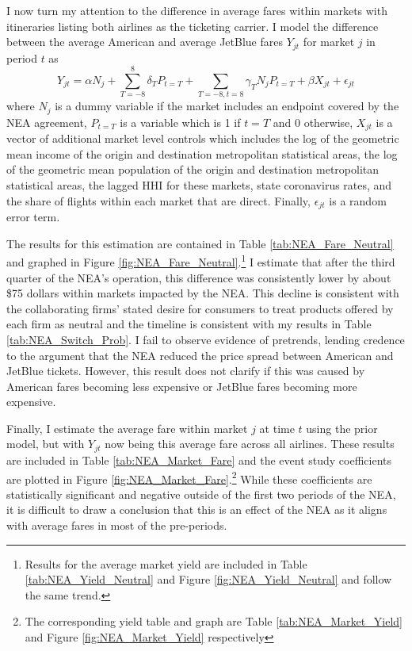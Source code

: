 \documentclass{article}
\begin{document}
	 I now turn my attention to the difference in average fares within markets with itineraries listing both airlines as the ticketing carrier.  I model the difference between the average American and average JetBlue fares $Y_{jt}$ for market $j$ in period $t$ as \[Y_{jt} = \alpha N_{j} + \sum_{T = -8}^{8} \delta_{T} P_{t = T} + \sum_{T = -8, t = 8} \gamma_{T} N_{j} P_{t = T} + \beta X_{jt} + \epsilon_{jt}\] where $N_{j}$ is a dummy variable if the market includes an endpoint covered by the NEA agreement, $P_{t = T}$ is a variable which is 1 if $t = T$ and 0 otherwise, $X_{jt}$ is a vector of additional market level controls which includes the log of the geometric mean income of the origin and destination metropolitan statistical areas, the log of the geometric mean population of the origin and destination metropolitan statistical areas, the lagged HHI for these markets, state coronavirus rates, and the share of flights within each market that are direct. Finally, $\epsilon_{jt}$ is a random error term. 
	 
	 The results for this estimation are contained in Table \ref{tab:NEA_Fare_Neutral} and graphed in Figure \ref{fig:NEA_Fare_Neutral}.\footnote{ Results for the average market yield are included in Table \ref{tab:NEA_Yield_Neutral} and Figure \ref{fig:NEA_Yield_Neutral} and follow the same trend.} I estimate that after the third quarter of the NEA's operation, this difference was consistently lower by about \$75 dollars within markets impacted by the NEA. This decline is consistent with the collaborating firms' stated desire for consumers to treat products offered by each firm as neutral and the timeline is consistent with my results in Table \ref{tab:NEA_Switch_Prob}. I fail to observe evidence of pretrends, lending credence to the argument that the NEA reduced the price spread between American and JetBlue tickets. However, this result does not clarify if this was caused by American fares becoming less expensive or JetBlue fares becoming more expensive. 
	
	Finally, I estimate the average fare within market $j$ at time $t$ using the prior model, but with $Y_{jt}$ now being this average fare across all airlines.  These results are included in Table \ref{tab:NEA_Market_Fare} and the event study coefficients are plotted in Figure \ref{fig:NEA_Market_Fare}.\footnote{The corresponding yield table and graph are Table \ref{tab:NEA_Market_Yield} and Figure \ref{fig:NEA_Market_Yield} respectively} While these coefficients are statistically significant and negative outside of the first two periods of the NEA, it is difficult to draw a conclusion that this is an effect of the NEA as it aligns with average fares in most of the pre-periods. 
	
\end{document}
